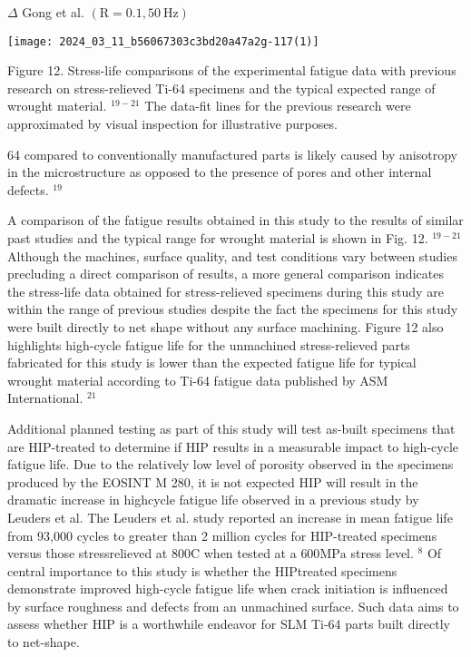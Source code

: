 \documentclass[10pt]{article}
\begin{document}
$\Delta$ Gong et al. $(\mathrm{R}=0.1,50 \mathrm{~Hz})$

\begin{center}
\texttt{[image: 2024\_03\_11\_b56067303c3bd20a47a2g-117(1)]}
\end{center}

Figure 12. Stress-life comparisons of the experimental fatigue data with previous research on stress-relieved Ti-64 specimens and the typical expected range of wrought material. ${ }^{19-21}$ The data-fit lines for the previous research were approximated by visual inspection for illustrative purposes.

64 compared to conventionally manufactured parts is likely caused by anisotropy in the microstructure as opposed to the presence of pores and other internal defects. ${ }^{19}$

A comparison of the fatigue results obtained in this study to the results of similar past studies and the typical range for wrought material is shown in Fig. 12. ${ }^{19-21}$ Although the machines, surface quality, and test conditions vary between studies precluding a direct comparison of results, a more general comparison indicates the stress-life data obtained for stress-relieved specimens during this study are within the range of previous studies despite the fact the specimens for this study were built directly to net shape without any surface machining. Figure 12 also highlights high-cycle fatigue life for the unmachined stress-relieved parts fabricated for this study is lower than the expected fatigue life for typical wrought material according to Ti-64 fatigue data published by ASM International. ${ }^{21}$

Additional planned testing as part of this study will test as-built specimens that are HIP-treated to determine if HIP results in a measurable impact to high-cycle fatigue life. Due to the relatively low level of porosity observed in the specimens produced by the EOSINT M 280, it is not expected HIP will result in the dramatic increase in highcycle fatigue life observed in a previous study by Leuders et al. The Leuders et al. study reported an increase in mean fatigue life from 93,000 cycles to greater than 2 million cycles for HIP-treated specimens versus those stressrelieved at $800 \mathrm{C}$ when tested at a $600 \mathrm{MPa}$ stress level. ${ }^{8}$ Of central importance to this study is whether the HIPtreated specimens demonstrate improved high-cycle fatigue life when crack initiation is influenced by surface roughness and defects from an unmachined surface. Such data aims to assess whether HIP is a worthwhile endeavor for SLM Ti-64 parts built directly to net-shape.
\end{document}
